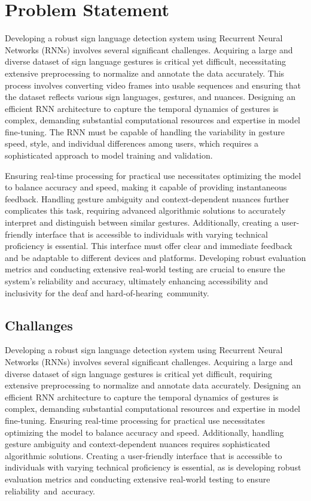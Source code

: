 \chapter{Problem Statement} Developing a robust sign language detection system using Recurrent Neural Networks (RNNs) involves several significant challenges. Acquiring a large and diverse dataset of sign language gestures is critical yet difficult, necessitating extensive preprocessing to normalize and annotate the data accurately. This process involves converting video frames into usable sequences and ensuring that the dataset reflects various sign languages, gestures, and nuances. Designing an efficient RNN architecture to capture the temporal dynamics of gestures is complex, demanding substantial computational resources and expertise in model fine-tuning. The RNN must be capable of handling the variability in gesture speed, style, and individual differences among users, which requires a sophisticated approach to model training and validation.

Ensuring real-time processing for practical use necessitates optimizing the model to balance accuracy and speed, making it capable of providing instantaneous feedback. Handling gesture ambiguity and context-dependent nuances further complicates this task, requiring advanced algorithmic solutions to accurately interpret and distinguish between similar gestures. Additionally, creating a user-friendly interface that is accessible to individuals with varying technical proficiency is essential. This interface must offer clear and immediate feedback and be adaptable to different devices and platforms. Developing robust evaluation metrics and conducting extensive real-world testing are crucial to ensure the system's reliability and accuracy, ultimately enhancing accessibility and inclusivity for the deaf and hard-of-hearing community.

\section{Challanges}
Developing a robust sign language detection system using Recurrent Neural Networks (RNNs) involves several significant challenges. Acquiring a large and diverse dataset of sign language gestures is critical yet difficult, requiring extensive preprocessing to normalize and annotate data accurately. Designing an efficient RNN architecture to capture the temporal dynamics of gestures is complex, demanding substantial computational resources and expertise in model fine-tuning. Ensuring real-time processing for practical use necessitates optimizing the model to balance accuracy and speed. Additionally, handling gesture ambiguity and context-dependent nuances requires sophisticated algorithmic solutions. Creating a user-friendly interface that is accessible to individuals with varying technical proficiency is essential, as is developing robust evaluation metrics and conducting extensive real-world testing to ensure reliability and accuracy.

